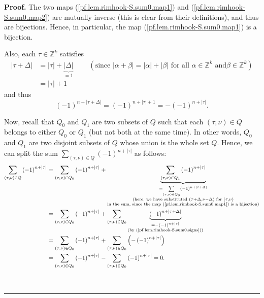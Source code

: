 \documentclass[numbers=enddot,12pt,final,onecolumn,notitlepage]{scrartcl}%
\theoremstyle{definition}
\newenvironment{proof}[1][Proof]{\noindent\textbf{#1.} }{\ \rule{0.5em}{0.5em}}
\let\sumnonlimits\sum
\renewcommand{\sum}{\sumnonlimits\limits}
\begin{document}
\begin{proof}
The two maps (\ref{pf.lem.rimhook-S.sum0.map1}) and
(\ref{pf.lem.rimhook-S.sum0.map2}) are mutually inverse (this is clear from
their definitions), and thus are bijections. Hence, in particular, the map
(\ref{pf.lem.rimhook-S.sum0.map1}) is a bijection.

Also, each $\tau\in\mathbb{Z}^{k}$ satisfies
\begin{align*}
\left\vert \tau+\Delta\right\vert  &  =\left\vert \tau\right\vert
+\underbrace{\left\vert \Delta\right\vert }_{=1}\ \ \ \ \ \ \ \ \ \ \left(
\text{since }\left\vert \alpha+\beta\right\vert =\left\vert \alpha\right\vert
+\left\vert \beta\right\vert \text{ for all }\alpha\in\mathbb{Z}^{k}\text{ and
}\beta\in\mathbb{Z}^{k}\right) \\
&  =\left\vert \tau\right\vert +1
\end{align*}
and thus%
\begin{equation}
\left(  -1\right)  ^{n+\left\vert \tau+\Delta\right\vert }=\left(  -1\right)
^{n+\left\vert \tau\right\vert +1}=-\left(  -1\right)  ^{n+\left\vert
\tau\right\vert }. \label{pf.lem.rimhook-S.sum0.signs}%
\end{equation}


Now, recall that $Q_{0}$ and $Q_{1}$ are two subsets of $Q$ such that each
$\left(  \tau,\nu\right)  \in Q$ belongs to either $Q_{0}$ or $Q_{1}$ (but not
both at the same time). In other words, $Q_{0}$ and $Q_{1}$ are two disjoint
subsets of $Q$ whose union is the whole set $Q$. Hence, we can split the sum
$\sum_{\left(  \tau,\nu\right)  \in Q}\left(  -1\right)  ^{n+\left\vert
\tau\right\vert }$ as follows:%
\begin{align*}
\sum_{\left(  \tau,\nu\right)  \in Q}\left(  -1\right)  ^{n+\left\vert
\tau\right\vert }  &  =\sum_{\left(  \tau,\nu\right)  \in Q_{0}}\left(
-1\right)  ^{n+\left\vert \tau\right\vert }+\underbrace{\sum_{\left(  \tau
,\nu\right)  \in Q_{1}}\left(  -1\right)  ^{n+\left\vert \tau\right\vert }%
}_{\substack{=\sum_{\left(  \tau,\nu\right)  \in Q_{0}}\left(  -1\right)
^{n+\left\vert \tau+\Delta\right\vert }\\\text{(here, we have substituted
}\left(  \tau+\Delta,\nu-\Delta\right)  \text{ for }\left(  \tau,\nu\right)
\\\text{in the sum, since the map (\ref{pf.lem.rimhook-S.sum0.map1}) is a
bijection)}}}\\
&  =\sum_{\left(  \tau,\nu\right)  \in Q_{0}}\left(  -1\right)  ^{n+\left\vert
\tau\right\vert }+\sum_{\left(  \tau,\nu\right)  \in Q_{0}}\underbrace{\left(
-1\right)  ^{n+\left\vert \tau+\Delta\right\vert }}_{\substack{=-\left(
-1\right)  ^{n+\left\vert \tau\right\vert }\\\text{(by
(\ref{pf.lem.rimhook-S.sum0.signs}))}}}\\
&  =\sum_{\left(  \tau,\nu\right)  \in Q_{0}}\left(  -1\right)  ^{n+\left\vert
\tau\right\vert }+\sum_{\left(  \tau,\nu\right)  \in Q_{0}}\left(  -\left(
-1\right)  ^{n+\left\vert \tau\right\vert }\right) \\
&  =\sum_{\left(  \tau,\nu\right)  \in Q_{0}}\left(  -1\right)  ^{n+\left\vert
\tau\right\vert }-\sum_{\left(  \tau,\nu\right)  \in Q_{0}}\left(  -1\right)
^{n+\left\vert \tau\right\vert }=0.
\end{align*}



\end{proof}
\end{document}
